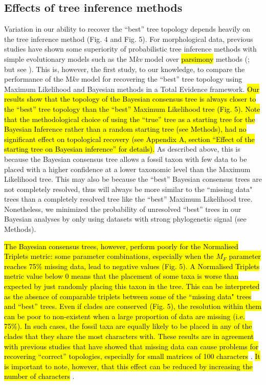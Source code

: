 \documentclass[12pt,letterpaper]{article}
\begin{document}
\subsection{Effects of tree inference methods}
Variation in our ability to recover the ``best'' tree topology depends heavily on the tree inference method (Fig. 4 and Fig. 5).
For morphological data, previous studies have shown some superiority of probabilistic tree inference methods with simple evolutionary models such as the M\textit{kv} model \citep{lewisa2001} over \hl{parsimony} methods (\citealp{wrightbayesian2014}; but see \citealp{spencerefficacy2013}).
This is, however, the first study, to our knowledge, to compare the performance of the M\textit{kv} model \citep{lewisa2001} for recovering the ``best'' tree topology using Maximum Likelihood and Bayesian methods in a Total Evidence framework.
\hl{Our results show that the topology of the Bayesian consensus tree is always closer to the ``best'' tree topology than the ``best'' Maximum Likelihood tree (Fig. 5).
Note that the methodological choice of using the ``true'' tree as a starting tree for the Bayesian Inference rather than a random starting tree (see Methods), had no significant effect on topological recovery (see Appendix A, section ``Effect of the starting tree on Bayesian inference'' for details).}
As described above, this is because the Bayesian consensus tree allows a fossil taxon with few data to be placed with a higher confidence at a lower taxonomic level than the Maximum Likelihood tree.
This may also be because the ``best'' Bayesian consensus trees are not completely resolved, thus will always be more similar to the ``missing data" trees than a completely resolved tree like the ``best'' Maximum Likelihood tree.
Nonetheless, we minimized the probability of unresolved ``best'' trees in our Bayesian analyses by only using datasets with strong phylogenetic signal (see Methods).

\hl{The Bayesian consensus trees, however, perform poorly for the Normalised Triplets metric: some parameter combinations, especially when the $M_F$ parameter reaches 75\% missing data, lead to negative values (Fig. 5).
A Normalised Triplets metric value below 0 means that the placement of some taxa is worse than expected by just randomly placing this taxon in the tree.
This can be interpreted as the absence of comparable triplets between some of the ``missing data" trees and ``best'' trees.
Even if clades are conserved (Fig. 5), the resolution within them can be poor to non-existent when a large proportion of data are missing (i.e. 75\%).
In such cases, the fossil taxa are equally likely to be placed in any of the clades that they share the most characters with.
These results are in agreement with previous studies that have showed that missing data can cause problems for recovering ``correct'' topologies, especially for small matrices of 100 characters }\citep{wiensmissing2003}.
\hl{It is important to note, however, that this effect can be reduced by increasing the number of characters }\citep{wiensmissing2003}.
\end{document}

